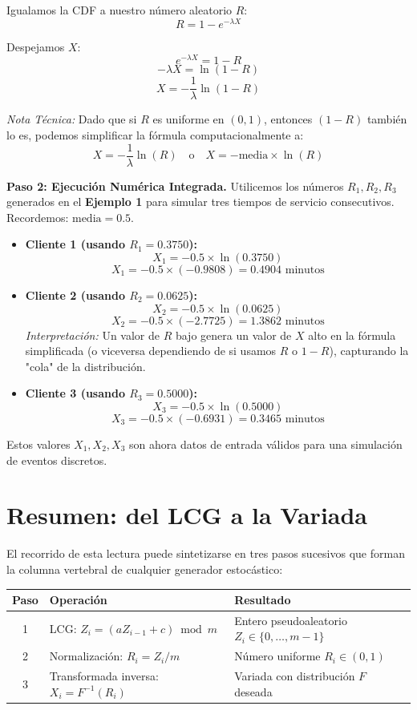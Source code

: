 \documentclass[11pt, letterpaper]{article}
\begin{document}
Igualamos la CDF a nuestro número aleatorio $R$:
$$ R = 1 - e^{-\lambda X} $$

Despejamos $X$:
$$ e^{-\lambda X} = 1 - R $$
$$ -\lambda X = \ln(1 - R) $$
$$ X = -\frac{1}{\lambda} \ln(1 - R) $$

\textit{Nota Técnica:} Dado que si $R$ es uniforme en $(0,1)$, entonces $(1-R)$ también lo es, podemos simplificar la fórmula computacionalmente a:
\begin{equation}
    X = -\frac{1}{\lambda} \ln(R) \quad \text{o} \quad X = -\text{media} \times \ln(R)
\end{equation}

\textbf{Paso 2: Ejecución Numérica Integrada.}
Utilicemos los números $R_1, R_2, R_3$ generados en el \textbf{Ejemplo 1} para simular tres tiempos de servicio consecutivos.
Recordemos: $\text{media} = 0.5$.

\begin{itemize}
    \item \textbf{Cliente 1 (usando $R_1 = 0.3750$):}
    $$ X_1 = -0.5 \times \ln(0.3750) $$
    $$ X_1 = -0.5 \times (-0.9808) = \mathbf{0.4904} \text{ minutos} $$

    \item \textbf{Cliente 2 (usando $R_2 = 0.0625$):}
    $$ X_2 = -0.5 \times \ln(0.0625) $$
    $$ X_2 = -0.5 \times (-2.7725) = \mathbf{1.3862} \text{ minutos} $$
    \textit{Interpretación:} Un valor de $R$ bajo genera un valor de $X$ alto en la fórmula simplificada (o viceversa dependiendo de si usamos $R$ o $1-R$), capturando la "cola" de la distribución.

    \item \textbf{Cliente 3 (usando $R_3 = 0.5000$):}
    $$ X_3 = -0.5 \times \ln(0.5000) $$
    $$ X_3 = -0.5 \times (-0.6931) = \mathbf{0.3465} \text{ minutos} $$
\end{itemize}

Estos valores $X_1, X_2, X_3$ son ahora datos de entrada válidos para una simulación de eventos discretos.

\section{Resumen: del LCG a la Variada}

El recorrido de esta lectura puede sintetizarse en tres pasos sucesivos que forman la columna vertebral de cualquier generador estocástico:

\begin{center}
\small
\begin{tabular}{clp{6cm}}
\toprule
\textbf{Paso} & \textbf{Operación} & \textbf{Resultado} \\
\midrule
1 & LCG: $Z_i = (aZ_{i-1}+c) \bmod m$ & Entero pseudoaleatorio $Z_i \in \{0,\ldots,m-1\}$ \\
2 & Normalización: $R_i = Z_i/m$ & Número uniforme $R_i \in (0,1)$ \\
3 & Transformada inversa: $X_i = F^{-1}(R_i)$ & Variada con distribución $F$ deseada \\
\bottomrule
\end{tabular}
\end{center}
\end{document}
